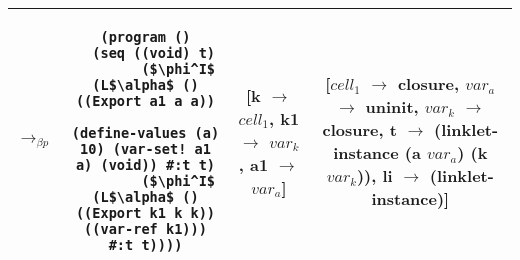 \begin{adjustbox}{center}
\begin{tabular}{lc|c|c}
    $\longrightarrow_{\beta p}$&\begin{lstlisting}[mathescape]
(program ()
  (seq ((void) t)
        ($\phi^I$ (L$\alpha$ () ((Export a1 a a))
                (define-values (a) 10) (var-set! a1 a) (void)) #:t t)
        ($\phi^I$ (L$\alpha$ () ((Export k1 k k)) ((var-ref k1))) #:t t))))
    \end{lstlisting} & \thead{[k $\rightarrow$ $cell_1$,\\k1 $\rightarrow$ $var_k$,\\a1 $\rightarrow$ $var_a$]} & \thead{[$cell_1$ $\rightarrow$ closure,\\$var_a$ $\rightarrow$ uninit,\\$var_k$ $\rightarrow$ closure,\\t $\rightarrow$ (linklet-instance\\(a $var_a$) (k $var_k$)),\\li $\rightarrow$ (linklet-instance)]} \\ \hline
  \end{tabular}
\end{adjustbox}

